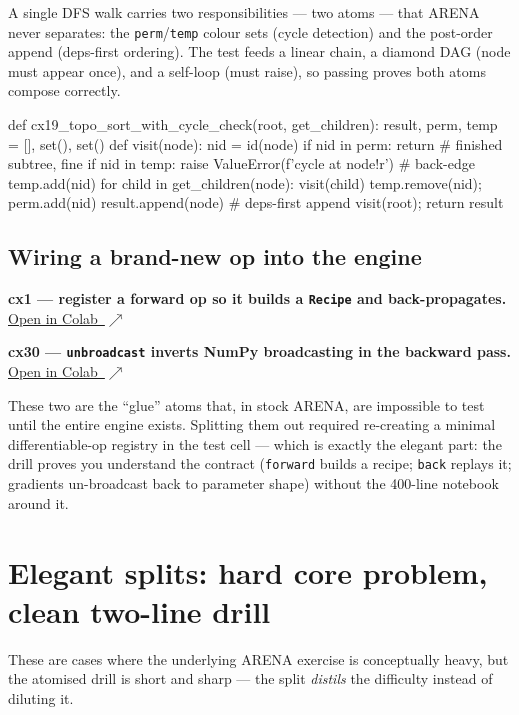 \documentclass[11pt]{article}
\newcommand{\colab}[1]{\href{https://colab.research.google.com/github/AkiraTheSquid/Delta-Drills/blob/main/arena-procedural-drills/#1}{Open in Colab \,$\nearrow$}}
\begin{document}
A single DFS walk carries two responsibilities --- two atoms --- that ARENA never separates:
the \texttt{perm}/\texttt{temp} colour sets (cycle detection) and the post-order append
(deps-first ordering). The test feeds a linear chain, a diamond DAG (node must appear once),
and a self-loop (must raise), so passing proves both atoms compose correctly.

\begin{code}
def cx19_topo_sort_with_cycle_check(root, get_children):
    result, perm, temp = [], set(), set()
    def visit(node):
        nid = id(node)
        if nid in perm: return                     # finished subtree, fine
        if nid in temp: raise ValueError(f'cycle at {node!r}')  # back-edge
        temp.add(nid)
        for child in get_children(node): visit(child)
        temp.remove(nid); perm.add(nid)
        result.append(node)                         # deps-first append
    visit(root); return result
\end{code}

\subsection{Wiring a brand-new op into the engine}
\textbf{cx1 --- register a forward op so it builds a \texttt{Recipe} and back-propagates.} \;\colab{composites/part4/001-wire-new-op-into-autograd.ipynb}

\textbf{cx30 --- \texttt{unbroadcast} inverts NumPy broadcasting in the backward pass.} \;\colab{composites/part4/030-unbroadcast-inverts-broadcast.ipynb}

These two are the ``glue'' atoms that, in stock ARENA, are impossible to test until the entire
engine exists. Splitting them out required re-creating a minimal differentiable-op registry in
the test cell --- which is exactly the elegant part: the drill proves you understand the
contract (\texttt{forward} builds a recipe; \texttt{back} replays it; gradients un-broadcast
back to parameter shape) without the 400-line notebook around it.

\section{Elegant splits: hard core problem, clean two-line drill}

These are cases where the underlying ARENA exercise is conceptually heavy, but the atomised
drill is short and sharp --- the split \emph{distils} the difficulty instead of diluting it.
\end{document}
